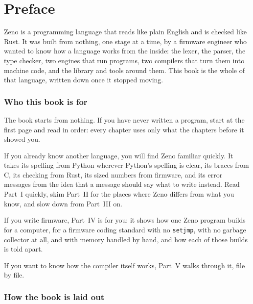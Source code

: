 \chapter*{Preface}\label{ch-preface}

Zeno is a programming language that reads like plain English and is
checked like Rust. It was built from nothing, one stage at a time, by
a firmware engineer who wanted to know how a language works from the
inside: the lexer, the parser, the type checker, two engines that run
programs, two compilers that turn them into machine code, and the
library and tools around them. This book is the whole of that
language, written down once it stopped moving.

\subsection*{Who this book is for}

The book starts from nothing. If you have never written a program,
start at the first page and read in order: every chapter uses only
what the chapters before it showed you.

If you already know another language, you will find Zeno familiar
quickly. It takes its spelling from Python wherever Python's spelling
is clear, its braces from C, its checking from Rust, its sized numbers
from firmware, and its error messages from the idea that a message
should say what to write instead. Read Part~I quickly, skim Part~II
for the places where Zeno differs from what you know, and slow down
from Part~III on.

If you write firmware, Part~IV is for you: it shows how one Zeno
program builds for a computer, for a firmware coding standard with no
\verb|setjmp|, with no garbage collector at all, and with memory
handled by hand, and how each of those builds is told apart.

If you want to know how the compiler itself works, Part~V walks
through it, file by file.

\subsection*{How the book is laid out}

